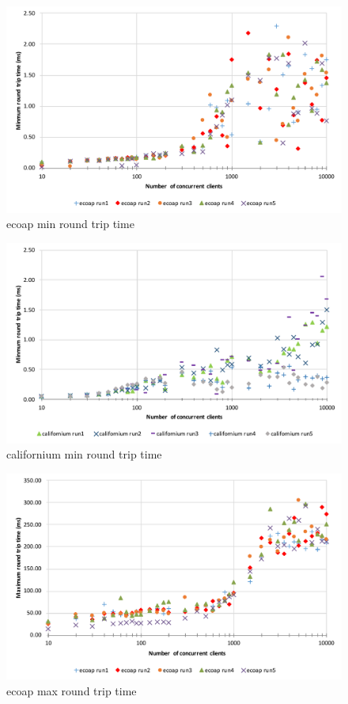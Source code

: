 \begin{figure}[!htbp]
\centering
\includegraphics[scale = 0.8]{ecoap_min_round_trip_time}
\caption{ecoap min round trip time}
\label{fig:ecoap_min_round_trip_time}
\end{figure}

\begin{figure}[!htbp]
\centering
\includegraphics[scale = 0.8]{californium_min_round_trip_time}
\caption{californium min round trip time}
\label{fig:californium_min_round_trip_time}
\end{figure}

\begin{figure}[!htbp]
\centering
\includegraphics[scale = 0.8]{ecoap_max_round_trip_time}
\caption{ecoap max round trip time}
\label{fig:ecoap_max_round_trip_time}
\end{figure}

